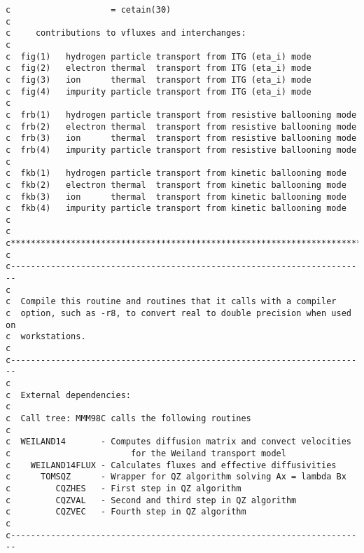 \begin{verbatim}
c                    = cetain(30)
c
c     contributions to vfluxes and interchanges: 
c
c  fig(1)   hydrogen particle transport from ITG (eta_i) mode
c  fig(2)   electron thermal  transport from ITG (eta_i) mode
c  fig(3)   ion      thermal  transport from ITG (eta_i) mode
c  fig(4)   impurity particle transport from ITG (eta_i) mode
c
c  frb(1)   hydrogen particle transport from resistive ballooning mode
c  frb(2)   electron thermal  transport from resistive ballooning mode
c  frb(3)   ion      thermal  transport from resistive ballooning mode
c  frb(4)   impurity particle transport from resistive ballooning mode
c
c  fkb(1)   hydrogen particle transport from kinetic ballooning mode
c  fkb(2)   electron thermal  transport from kinetic ballooning mode
c  fkb(3)   ion      thermal  transport from kinetic ballooning mode
c  fkb(4)   impurity particle transport from kinetic ballooning mode
c
c
c***********************************************************************
c
c-----------------------------------------------------------------------
c
c  Compile this routine and routines that it calls with a compiler 
c  option, such as -r8, to convert real to double precision when used on 
c  workstations.
c
c-----------------------------------------------------------------------
c
c  External dependencies:
c
c  Call tree: MMM98C calls the following routines
c
c  WEILAND14       - Computes diffusion matrix and convect velocities
c                        for the Weiland transport model
c    WEILAND14FLUX - Calculates fluxes and effective diffusivities
c      TOMSQZ      - Wrapper for QZ algorithm solving Ax = lambda Bx
c         CQZHES   - First step in QZ algorithm 
c         CQZVAL   - Second and third step in QZ algorithm
c         CQZVEC   - Fourth step in QZ algorithm
c
c-----------------------------------------------------------------------


\end{verbatim}
